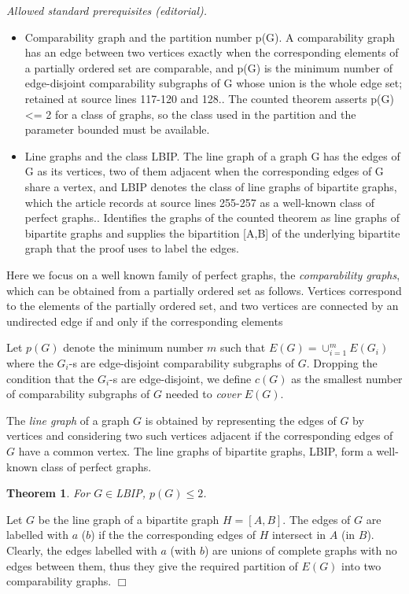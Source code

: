 \documentclass[12pt]{article}
\newtheorem{theorem}{Theorem}%
\def\qed{\ifhmode\unskip\nobreak\fi\quad\ifmmode\Box\else$\Box$\fi}
\def\qed{\hfill $\Box$}
\begin{document}
\noindent\textit{Allowed standard prerequisites (editorial).}\begin{itemize}
\item Comparability graph and the partition number p(G). A comparability graph has an edge between two vertices exactly when the corresponding elements of a partially ordered set are comparable, and p(G) is the minimum number of edge-disjoint comparability subgraphs of G whose union is the whole edge set; retained at source lines 117-120 and 128.. The counted theorem asserts p(G) <= 2 for a class of graphs, so the class used in the partition and the parameter bounded must be available.
\item Line graphs and the class LBIP. The line graph of a graph G has the edges of G as its vertices, two of them adjacent when the corresponding edges of G share a vertex, and LBIP denotes the class of line graphs of bipartite graphs, which the article records at source lines 255-257 as a well-known class of perfect graphs.. Identifies the graphs of the counted theorem as line graphs of bipartite graphs and supplies the bipartition [A,B] of the underlying bipartite graph that the proof uses to label the edges.
\end{itemize}\medskip
Here we focus on a well known family of perfect graphs, the {\em comparability graphs},
which can be obtained from a partially ordered set as follows.
Vertices correspond to the elements of the partially ordered set,
and two vertices are connected by an undirected edge if and only if the corresponding elements

Let $p(G)$ denote the minimum number $m$ such that $E(G)=\cup_{i=1}^m E(G_i)$ where the $G_i$-s are edge-disjoint comparability subgraphs of $G$.
Dropping  the condition that the $G_i$-s are edge-disjoint, we define $c(G)$ as the smallest number of comparability subgraphs of $G$ needed to {\em cover} $E(G)$.

The {\em line graph} of a graph $G$ is obtained by representing the edges of $G$ by vertices and
considering two such vertices adjacent if the corresponding edges of $G$ have a common vertex.
The line graphs of bipartite graphs, LBIP, form a well-known class of perfect graphs.

\begin{theorem}\label{bipline} For $G\in $LBIP, $p(G)\le 2$.
\end{theorem}

  Let $G$ be the line graph of a bipartite graph $H=[A,B]$.
The edges of $G$ are labelled with $a$ ($b$) if the the corresponding edges of $H$ intersect in $A$ (in $B$).
Clearly, the edges labelled with $a$ (with $b$) are unions of complete graphs with no edges between them,
thus they give the required partition of $E(G)$ into two comparability graphs. \qed
\end{document}
